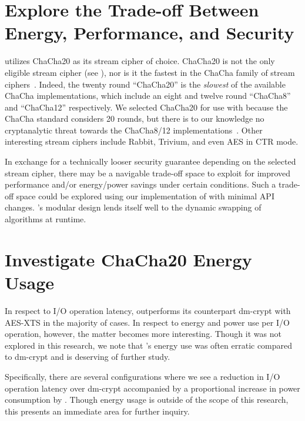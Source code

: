 \section{Explore the Trade-off Between Energy, Performance, and Security}

\SYSTEM{} utilizes ChaCha20 as its stream cipher of choice. ChaCha20 is not the
only eligible stream cipher (see ), nor is it the fastest in the
ChaCha family of stream ciphers~\cite{ChaCha20}. Indeed, the twenty round
``ChaCha20'' is the \textit{slowest} of the available ChaCha implementations,
which include an eight and twelve round ``ChaCha8'' and ``ChaCha12''
respectively. We selected ChaCha20 for use with \SYSTEM{} because the ChaCha
standard considers 20 rounds, but there is to our knowledge no cryptanalytic
threat towards the ChaCha8/12 implementations~\cite{ChaCha-Cryptanalysis}. Other
interesting stream ciphers include Rabbit, Trivium, and even AES in CTR mode.

In exchange for a technically looser security guarantee depending on the
selected stream cipher, there may be a navigable trade-off space to exploit for
improved performance and/or energy/power savings under certain conditions. Such
a trade-off space could be explored using our implementation of \SYSTEM{} with
minimal API changes. \SYSTEM{}'s modular design lends itself well to the dynamic
swapping of algorithms at runtime.

\section{Investigate ChaCha20 Energy Usage}

In respect to I/O operation latency, \SYSTEM{} outperforms its counterpart
dm-crypt with AES-XTS in the majority of cases. In respect to energy and power
use per I/O operation, however, the matter becomes more interesting. Though it
was not explored in this research, we note that \SYSTEM{}'s energy use was
often erratic compared to dm-crypt and is deserving of further study.

Specifically, there are several \SYSTEM{} configurations where we see a
reduction in I/O operation latency over dm-crypt accompanied by a proportional
increase in power consumption by \SYSTEM{}. Though energy usage is outside of
the scope of this research, this presents an immediate area for further inquiry.

\balance
